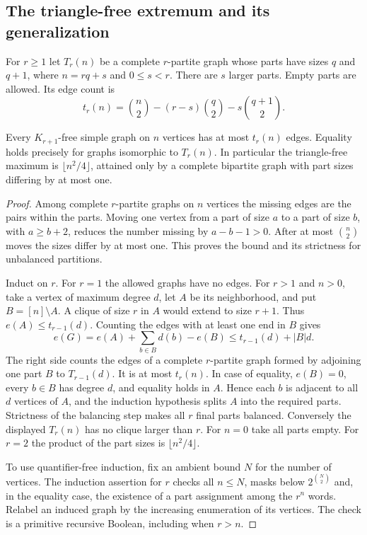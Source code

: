 \subsection{The triangle-free extremum and its generalization}

For $r\ge1$ let $T_r(n)$ be a complete $r$-partite graph whose parts have sizes $q$ and $q+1$, where $n=rq+s$ and $0\le s<r$. There are $s$ larger parts. Empty parts are allowed. Its edge count is
\[
 t_r(n)=\binom n2-(r-s)\binom q2-s\binom{q+1}2 .
\]

\begin{theorem}\label{result20}\label{thm:graph-turan}
Every $K_{r+1}$-free simple graph on $n$ vertices has at most $t_r(n)$ edges. Equality holds precisely for graphs isomorphic to $T_r(n)$. In particular the triangle-free maximum is $\lfloor n^2/4\rfloor$, attained only by a complete bipartite graph with part sizes differing by at most one.
\end{theorem}
\begin{proof}
Among complete $r$-partite graphs on $n$ vertices the missing edges are the pairs within the parts. Moving one vertex from a part of size $a$ to a part of size $b$, with $a\ge b+2$, reduces the number missing by $a-b-1>0$. After at most $\binom n2$ moves the sizes differ by at most one. This proves the bound and its strictness for unbalanced partitions.

Induct on $r$. For $r=1$ the allowed graphs have no edges. For $r>1$ and $n>0$, take a vertex of maximum degree $d$, let $A$ be its neighborhood, and put $B=[n]\setminus A$. A clique of size $r$ in $A$ would extend to size $r+1$. Thus $e(A)\le t_{r-1}(d)$. Counting the edges with at least one end in $B$ gives
\[
 e(G)=e(A)+\sum_{b\in B}d(b)-e(B)
       \le t_{r-1}(d)+|B|d.
\]
The right side counts the edges of a complete $r$-partite graph formed by adjoining one part $B$ to $T_{r-1}(d)$. It is at most $t_r(n)$. In case of equality, $e(B)=0$, every $b\in B$ has degree $d$, and equality holds in $A$. Hence each $b$ is adjacent to all $d$ vertices of $A$, and the induction hypothesis splits $A$ into the required parts. Strictness of the balancing step makes all $r$ final parts balanced. Conversely the displayed $T_r(n)$ has no clique larger than $r$. For $n=0$ take all parts empty. For $r=2$ the product of the part sizes is $\lfloor n^2/4\rfloor$.

To use quantifier-free induction, fix an ambient bound $N$ for the number of vertices. The induction assertion for $r$ checks all $n\le N$, masks below $2^{\binom N2}$ and, in the equality case, the existence of a part assignment among the $r^n$ words. Relabel an induced graph by the increasing enumeration of its vertices. The check is a primitive recursive Boolean, including when $r>n$.
\end{proof}

